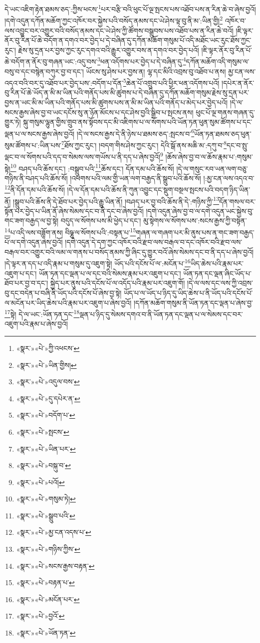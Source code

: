 དེ་ཡང་འཇིག་རྟེན་ཐམས་ཅད་:ཀྱིས་ཕངས་\footnote{«སྣར་»«པེ་»ཀྱི་འཕངས་}པར་བརྩི་བའི་ཕུང་པོ་ལྔ་སྤངས་པས་འཐོབ་པས་ན་རིན་ཆེ་བ་ཞེས་བྱའོ། །དགེ་འདུན་དཀོན་མཆོག་ཀྱང་འཁོར་བར་སྐྱེས་པའི་བསོད་ནམས་དང་ཡེ་ཤེས་ལྟ་བུ་ནི་མ་:ཡིན་གྱི།\footnote{«སྣར་»«པེ་»ཡིན་གྱིས།} འཁོར་བ་ལས་འབྱུང་བར་འགྱུར་བའི་བསོད་ནམས་དང་ཡེ་ཤེས་ཀྱི་ཚོགས་བསྒྲུབས་པས་འཐོབ་པས་ན་རིན་ཆེ་བའོ། །ཇི་ལྟར་ནོར་བུ་རིན་པོ་ཆེ་བདོག་ན་དགའ་བར་བྱེད་པ་དེ་བཞིན་དུ་དཀོན་མཆོག་གསུམ་པོ་འདི་མཐོང་ཡང་རུང་ཐོས་ཀྱང་རུང་། རྗེས་སུ་དྲན་པར་བྱས་ཀྱང་རུང་དགའ་བའི་རྒྱུར་འགྱུར་བས་ན་དགའ་བར་བྱེད་པའོ། །ཇི་ལྟར་ནོར་བུ་རིན་པོ་ཆེ་བདོག་ན་ནོར་བུ་གཞན་ཡང་:འདུ་བས་\footnote{«སྣར་»«པེ་»འདུལ་བས་}ཕན་འདོགས་པར་བྱེད་པ་དེ་བཞིན་དུ་\footnote{«སྣར་»«པེ་»དུ་དཔེར་ན་}དཀོན་མཆོག་འདི་གསུམ་ལ་བསུ་བ་དང་བསྙེན་བཀུར་བྱ་བ་དང་། ཡོངས་སུ་ཤེས་པར་བྱས་ན། ལྷ་དང་མིའི་འབྲས་བུ་འཐོབ་པ་ནས། མྱ་ངན་ལས་འདའ་བའི་བར་དུ་འཐོབ་པར་བྱེད་པས་:བདོག་པ་དོན་\footnote{«སྣར་»«པེ་»བདོག་པ་}ཆེན་པོ་འགྲུབ་པའི་ཕྱིར་ཕན་འདོགས་པའོ། །དཔེར་ན་ནོར་བུ་རིན་པོ་ཆེ་ཡོད་ན་མི་མ་ཡིན་པའི་གནོད་པས་མི་ཚུགས་པ་དེ་བཞིན་དུ་དཀོན་མཆོག་གསུམ་རྗེས་སུ་དྲན་པར་བྱས་ན་ཡང་མི་མ་ཡིན་པའི་གནོད་པས་མི་ཚུགས་པས་ན་མི་མ་ཡིན་པའི་གནོད་པ་མེད་པར་བྱེད་པའོ། །དེ་ལ་སངས་རྒྱས་ཞེས་བྱ་བ་ཡང་དངོས་སུ་ན་ཉོན་མོངས་པ་དང་ཤེས་བྱའི་སྒྲིབ་པ་སྤངས་ནས། ཕུང་པོ་ལྔ་གནས་གཞན་དུ་གྱུར་ཏེ། སྐུ་གསུམ་ལྷུན་གྱིས་གྲུབ་ནས་སྟོབས་དང་མི་འཇིགས་པ་ལ་སོགས་པའི་ཡོན་ཏན་ཕུན་སུམ་ཚོགས་པ་དང་ལྡན་པ་ལ་སངས་རྒྱས་ཞེས་བྱའོ། །དེ་ལ་སངས་རྒྱས་དེ་ནི་ཉེས་པ་ཐམས་ཅད་:སྤངས་བ་\footnote{«སྣར་»«པེ་»སྤངས་}ཡོན་ཏན་ཐམས་ཅད་ཕུན་སུམ་ཚོགས་པ་:ཡིན་པས་\footnote{«སྣར་»«པེ་»ཡིན་པར་}ཐོས་ཀྱང་རུང་། །བདག་གིས་ཤེས་ཀྱང་རུང་། དེའི་སྒོ་ནས་མཆི་མ་:དཀུ་བ་\footnote{«སྣར་»«པེ་»བསྐུ་བ་}དང་བ་སྤུ་ལྡང་བ་ལ་སོགས་པའི་དད་བ་སེམས་ལས་གཡོས་པ་ནི་དད་པ་ཞེས་བྱའོ།\footnote{«སྣར་»«པེ་»པའོ།} །ཆོས་ཞེས་བྱ་བ་ལ་ཆོས་རྣམ་པ་:གསུམ་སྟེ།\footnote{«སྣར་»«པེ་»གསུམ་ཏེ།} བཤད་པའི་ཆོས་དང་། :བསྒྲུབ་པའི་\footnote{«སྣར་»«པེ་»སྒྲུབ་པའི་}ཆོས་དང་། དོན་དམ་པའི་ཆོས་སོ། །དེ་ལ་གསུང་རབ་ཡན་ལག་བཅུ་གཉིས་ནི་བཤད་པའི་ཆོས་སོ། །འཕགས་པའི་ལམ་གྱི་ཡན་ལག་བརྒྱད་ནི་སྒྲུབ་པའི་ཆོས་སོ། །:མྱ་ངན་ལས་འདའ་བ་\footnote{«སྣར་»«པེ་»མྱ་ངན་འདས་པ་}ནི་དོན་དམ་པའི་ཆོས་སོ། །དེ་ལ་དོན་དམ་པའི་ཆོས་ནི་ཀུན་འབྱུང་དང་སྡུག་བསྔལ་སྤངས་པའི་བདག་ཉིད་ཡིན་ནོ། །སྒྲུབ་པའི་ཆོས་ནི་དེ་ཐོབ་པར་བྱེད་པའི་རྒྱུ་ཡིན་ནོ། །བཤད་པར་བྱ་བའི་ཆོས་ནི་དེ་:གཉིས་ཀྱི་\footnote{«སྣར་»«པེ་»གཉིས་ཀྱིས་}དོན་གསལ་བར་སྟོན་པར་བྱེད་པ་ཡིན་ནོ་ཞེས་སེམས་དང་བ་ནི་དང་བ་ཞེས་བྱའོ། །དགེ་འདུན་ཞེས་བྱ་བ་ལ་དགེ་འདུན་ཡང་སྐྱེས་བུ་གང་ཟག་བརྒྱད་ལ་བྱ་སྟེ། བདུད་ལ་སོགས་པས་མི་ཕྱེད་པ་དང་། མུ་སྟེགས་ལ་སོགས་པས་:སངས་རྒྱས་ཀྱི་བསྟན་\footnote{«སྣར་»«པེ་»སངས་རྒྱས་བརྟན་}པ་འདི་ལས་བཟློག་ནས། བིཥྞུ་ལ་སོགས་པའི་:བསྟན་པ་\footnote{«སྣར་»«པེ་»བརྟན་པ་}གཞན་ལ་གཞག་པར་མི་ནུས་པས་ན་གང་ཟག་བརྒྱད་པོ་ལ་དགེ་འདུན་ཞེས་བྱའོ། །དགེ་འདུན་དེ་དག་ཀྱང་འཁོར་བའི་རྫབ་ལས་བརྒལ་བ་དང་འཁོར་བའི་རྫབ་ལས་བརྒལ་བར་འགྱུར་བའི་ལམ་ལ་གནས་པ་བསོད་ནམས་ཀྱི་ཞིང་དུ་གྱུར་བའོ་ཞེས་སེམས་དང་བ་ནི་དད་པ་ཞེས་བྱའོ། །དེ་ལྟར་ན་དད་པ་འདི་རྣམ་པ་གསུམ་དུ་འཇུག་སྟེ། ཡོད་པའི་དངོས་པོ་ལ་:མངོན་པ་\footnote{«སྣར་»«པེ་»མངོན་པར་}ཡིད་ཆེས་པའི་རྣམ་པར་འཇུག་པ་དང་། ཡོན་ཏན་དང་ལྡན་པ་ལ་དང་བའི་སེམས་རྣམ་པར་འཇུག་པ་དང་། ཡོན་ཏན་དང་ལྡན་ཞིང་ཡོད་པ་ཐོབ་པར་བྱ་བ་དང་། སྐྱེད་པར་ནུས་པའི་དངོས་པོ་ལ་འདོད་པའི་རྣམ་པར་འཇུག་གོ། །དེ་ལ་ལས་དང་ལས་ཀྱི་འབྲས་བུ་དང་བདེན་པ་བཞི་ནི་ཡོད་པའི་དངོས་པོ་ཞེས་བྱ་སྟེ། ཡོད་པ་ལ་ཡོད་པ་ཉིད་དུ་ཡིད་ཆེས་པ་ནི་ཡོད་པའི་དངོས་པོ་ལ་མངོན་པར་ཡིད་ཆེས་པའི་རྣམ་པར་འཇུག་པ་ཞེས་བྱའོ། །དཀོན་མཆོག་གསུམ་ནི་ཡོན་ཏན་དང་ལྡན་པ་ཞེས་བྱ་\footnote{«སྣར་»«པེ་»བྱའོ་}སྟེ། དེ་ལ་ཡང་:ཡོན་ཏན་དང་\footnote{«སྣར་»«པེ་»ཡོན་ཏན་}ལྡན་པ་ཉིད་དུ་སེམས་དགའ་བ་ནི་ཡོན་ཏན་དང་ལྡན་པ་ལ་སེམས་དང་བར་འཇུག་པའི་རྣམ་པ་ཞེས་བྱའོ། 